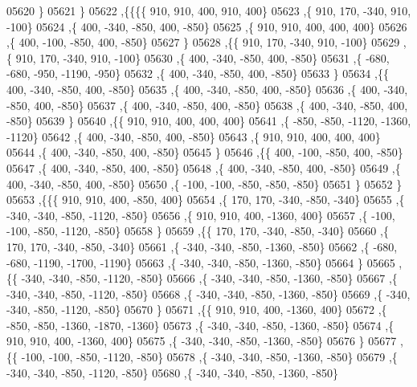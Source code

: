 \begin{DoxyCode}
05620    \}
05621   \}
05622  ,\{\{\{\{   910,   910,   400,   910,   400\}
05623     ,\{   910,   170,  -340,   910,  -100\}
05624     ,\{   400,  -340,  -850,   400,  -850\}
05625     ,\{   910,   910,   400,   400,   400\}
05626     ,\{   400,  -100,  -850,   400,  -850\}
05627     \}
05628    ,\{\{   910,   170,  -340,   910,  -100\}
05629     ,\{   910,   170,  -340,   910,  -100\}
05630     ,\{   400,  -340,  -850,   400,  -850\}
05631     ,\{  -680,  -680,  -950, -1190,  -950\}
05632     ,\{   400,  -340,  -850,   400,  -850\}
05633     \}
05634    ,\{\{   400,  -340,  -850,   400,  -850\}
05635     ,\{   400,  -340,  -850,   400,  -850\}
05636     ,\{   400,  -340,  -850,   400,  -850\}
05637     ,\{   400,  -340,  -850,   400,  -850\}
05638     ,\{   400,  -340,  -850,   400,  -850\}
05639     \}
05640    ,\{\{   910,   910,   400,   400,   400\}
05641     ,\{  -850,  -850, -1120, -1360, -1120\}
05642     ,\{   400,  -340,  -850,   400,  -850\}
05643     ,\{   910,   910,   400,   400,   400\}
05644     ,\{   400,  -340,  -850,   400,  -850\}
05645     \}
05646    ,\{\{   400,  -100,  -850,   400,  -850\}
05647     ,\{   400,  -340,  -850,   400,  -850\}
05648     ,\{   400,  -340,  -850,   400,  -850\}
05649     ,\{   400,  -340,  -850,   400,  -850\}
05650     ,\{  -100,  -100,  -850,  -850,  -850\}
05651     \}
05652    \}
05653   ,\{\{\{   910,   910,   400,  -850,   400\}
05654     ,\{   170,   170,  -340,  -850,  -340\}
05655     ,\{  -340,  -340,  -850, -1120,  -850\}
05656     ,\{   910,   910,   400, -1360,   400\}
05657     ,\{  -100,  -100,  -850, -1120,  -850\}
05658     \}
05659    ,\{\{   170,   170,  -340,  -850,  -340\}
05660     ,\{   170,   170,  -340,  -850,  -340\}
05661     ,\{  -340,  -340,  -850, -1360,  -850\}
05662     ,\{  -680,  -680, -1190, -1700, -1190\}
05663     ,\{  -340,  -340,  -850, -1360,  -850\}
05664     \}
05665    ,\{\{  -340,  -340,  -850, -1120,  -850\}
05666     ,\{  -340,  -340,  -850, -1360,  -850\}
05667     ,\{  -340,  -340,  -850, -1120,  -850\}
05668     ,\{  -340,  -340,  -850, -1360,  -850\}
05669     ,\{  -340,  -340,  -850, -1120,  -850\}
05670     \}
05671    ,\{\{   910,   910,   400, -1360,   400\}
05672     ,\{  -850,  -850, -1360, -1870, -1360\}
05673     ,\{  -340,  -340,  -850, -1360,  -850\}
05674     ,\{   910,   910,   400, -1360,   400\}
05675     ,\{  -340,  -340,  -850, -1360,  -850\}
05676     \}
05677    ,\{\{  -100,  -100,  -850, -1120,  -850\}
05678     ,\{  -340,  -340,  -850, -1360,  -850\}
05679     ,\{  -340,  -340,  -850, -1120,  -850\}
05680     ,\{  -340,  -340,  -850, -1360,  -850\}

\end{DoxyCode}
